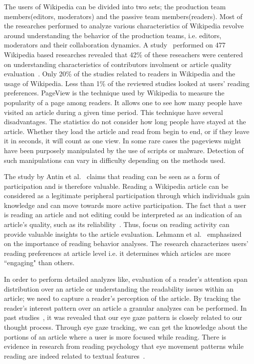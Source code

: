 \documentclass[12pt]{article}
\begin{document}
The users of Wikipedia can be divided into two sets; the production team members(editors, moderators) and the passive team members(readers). Most of the researches performed to analyze various characteristics of Wikipedia revolve around understanding the behavior of the production teams, i.e. editors, moderators and their collaboration dynamics. A study~\cite{okoli2012people} performed on 477 Wikipedia based researches revealed that 42\% of these reseachers were centered on understanding characteristics of contributors involment or article quality evaluation~\cite{wilkinson2007assessing, kittur2008harnessing, stvilia2008information}. Only 20\% of the studies related to readers in Wikipedia and the usage of Wikipedia. Less than 1\% of the reviewed studies looked at users' reading preferences.
PageView is the technique used by Wikipedia to measure the popularity of a page among readers. It allows one to see how many people have visited an article during a given time period. This technique have several disadvantages. The statistics do not consider how long people have stayed at the article. Whether they load the article and read from begin to end, or if they leave it in seconds, it will count as one view.
In some rare cases the pageviews might have been purposely manipulated by the use of scripts or malware. Detection of such manipulations can vary in difficulty depending on the methods used.

The study by Antin et al.~\cite{antin2010readers} claims that reading can be seen as a form of participation and is therefore valuable. Reading a Wikipedia article can be considered as a legitimate peripheral participation through which individuals gain knowledge and can move towards more active participation. The fact that a user is reading an article and not editing could be interpreted as an indication of an article's quality, such as its reliability~\cite{adler2008assigning}. Thus, focus on reading activity can provide valuable insights to the article evaluation. Lehmann et al.~\cite{lehmann2014reader} emphasized on the importance of reading behavior analyses. The research characterizes users' reading preferences at article level i.e. it determines which articles are more ``engaging" than others. 

In order to perform detailed analyzes like, evaluation of a reader's attention span distribution over an article or understanding the readability issues within an article; we need to capture a reader's perception of the article. By tracking the reader's interest pattern over an article a granular analyzes can be performed. In past studies~\cite{calder2002reading, bff9c00ddce3404ca729f4a96d53a701}, it was revealed that our eye gaze pattern is closely related to our thought process. Through eye gaze tracking, we can get the knowledge about the portions of an article where a user is more focused while reading. There is evidence in research from reading psychology that eye movement patterns while reading are indeed related to textual features~\cite{rayner1978eye}.
\end{document}

